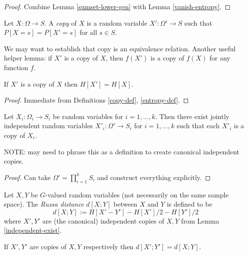 \begin{proof}  Combine Lemma \ref{sumset-lower-gen} with Lemma \ref{vanish-entropy}.
\end{proof}

\begin{definition}[Copy]\label{copy-def}  Let $X : \Omega \to S$.  A \emph{copy} of $X$ is a random variable $X' : \Omega' \to S$ such that $P[X=s] = P[X'=s]$ for all $s \in S$.
\end{definition}

We may want to establish that copy is an equivalence relation. Another useful helper lemma: if $X'$ is a copy of $X$, then $f(X')$ is a copy of $f(X)$ for any function $f$.

\begin{lemma}\label{copy-ent} If $X'$ is a copy of $X$ then $H[X'] = H[X]$.
\end{lemma}

\begin{proof} Immediate from Definitions \ref{copy-def}, \ref{entropy-def}.
\end{proof}

\begin{lemma}\label{independent-exist}  Let $X_i : \Omega_i \to S_i$ be random variables for $i=1,\dots,k$.  Then there exist jointly independent random variables $X'_i: \Omega' \to S_i$ for $i=1,\dots,k$ such that each $X'_i$ is a copy of $X_i$.
\end{lemma}

NOTE: may need to phrase this as a definition to create canonical independent copies.

\begin{proof} Can take $\Omega' = \prod_{i=1}^k S_i$ and construct everything explicitly.
\end{proof}

\begin{definition}\label{ruz-dist-def}  Let $X,Y$ be $G$-valued random variables (not necessarily on the same sample space).  The \emph{Ruzsa distance} $d[X;Y]$ between $X$ and $Y$ is defined to be
$$ d[X;Y] := H[X' - Y'] - H[X']/2 - H[Y']/2$$
where $X',Y'$ are (the canonical) independent copies of $X,Y$ from Lemma \ref{independent-exist}.
\end{definition}

\begin{lemma}\label{ruz-copy}  If $X',Y'$ are copies of $X,Y$ respectively then $d[X';Y']=d[X;Y]$.
\end{lemma}

